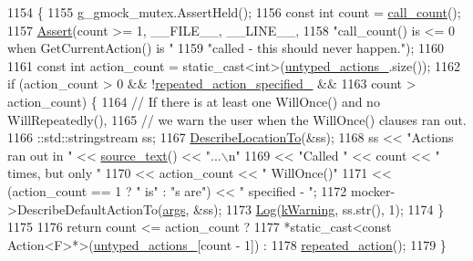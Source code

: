 \begin{DoxyCode}
1154                                                         \{
1155     g\_gmock\_mutex.AssertHeld();
1156     \textcolor{keyword}{const} \textcolor{keywordtype}{int} count = \hyperlink{classtesting_1_1internal_1_1ExpectationBase_aacc0399271907194ac1627439f65047a}{call\_count}();
1157     \hyperlink{namespacetesting_1_1internal_a7a259643b7f2d23ce2b757728df42c99}{Assert}(count >= 1, \_\_FILE\_\_, \_\_LINE\_\_,
1158            \textcolor{stringliteral}{"call\_count() is <= 0 when GetCurrentAction() is "}
1159            \textcolor{stringliteral}{"called - this should never happen."});
1160 
1161     \textcolor{keyword}{const} \textcolor{keywordtype}{int} action\_count = \textcolor{keyword}{static\_cast<}\textcolor{keywordtype}{int}\textcolor{keyword}{>}(\hyperlink{classtesting_1_1internal_1_1ExpectationBase_a9558ff6b8b1b7e3a99fac1f93d1826da}{untyped\_actions\_}.size());
1162     \textcolor{keywordflow}{if} (action\_count > 0 && !\hyperlink{classtesting_1_1internal_1_1ExpectationBase_abecd382b79252ffc0779d51e058b681c}{repeated\_action\_specified\_} &&
1163         count > action\_count) \{
1164       \textcolor{comment}{// If there is at least one WillOnce() and no WillRepeatedly(),}
1165       \textcolor{comment}{// we warn the user when the WillOnce() clauses ran out.}
1166       ::std::stringstream ss;
1167       \hyperlink{classtesting_1_1internal_1_1ExpectationBase_a666e7f8fb2412e78f090244e6bfd4493}{DescribeLocationTo}(&ss);
1168       ss << \textcolor{stringliteral}{"Actions ran out in "} << \hyperlink{classtesting_1_1internal_1_1ExpectationBase_a77efdf254df61cfc4f28c91b0e6f62aa}{source\_text}() << \textcolor{stringliteral}{"...\(\backslash\)n"}
1169          << \textcolor{stringliteral}{"Called "} << count << \textcolor{stringliteral}{" times, but only "}
1170          << action\_count << \textcolor{stringliteral}{" WillOnce()"}
1171          << (action\_count == 1 ? \textcolor{stringliteral}{" is"} : \textcolor{stringliteral}{"s are"}) << \textcolor{stringliteral}{" specified - "};
1172       mocker->DescribeDefaultActionTo(\hyperlink{namespacegenerate__debs_a75f9143e38df82d83b2e8a6f99cae02c}{args}, &ss);
1173       \hyperlink{namespacetesting_1_1internal_ac0bc151763a8187d74387c4b2ba685c9}{Log}(\hyperlink{namespacetesting_1_1internal_a203d1a8a2147a53d12bbdae40d443914a5beeeab1b0a3caabd0afb43356c1a271}{kWarning}, ss.str(), 1);
1174     \}
1175 
1176     \textcolor{keywordflow}{return} count <= action\_count ?
1177         *\textcolor{keyword}{static\_cast<}\textcolor{keyword}{const }Action<F>*\textcolor{keyword}{>}(\hyperlink{classtesting_1_1internal_1_1ExpectationBase_a9558ff6b8b1b7e3a99fac1f93d1826da}{untyped\_actions\_}[count - 1]) :
1178         \hyperlink{classtesting_1_1internal_1_1TypedExpectation_a2b32621ac4d71c1a71893eb0499f723d}{repeated\_action}();
1179   \}
\end{DoxyCode}
